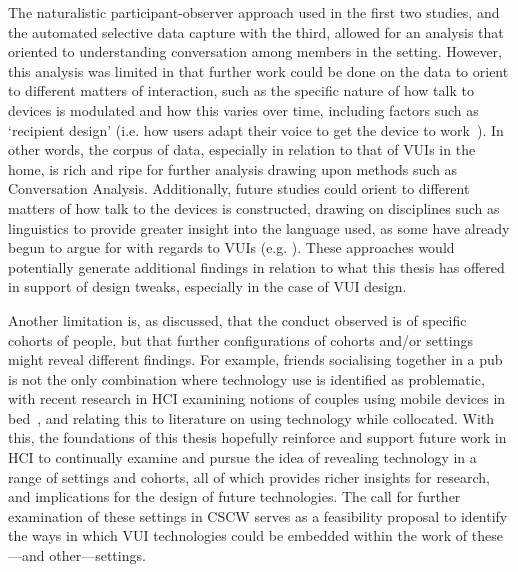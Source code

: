 \begin{revisedsubmission}
The naturalistic participant-observer approach used in the first two studies, and the automated selective data capture with the third, allowed for an analysis that oriented to understanding conversation among members in the setting.
However, this analysis was limited in that further work could be done on the data to orient to different matters of interaction, such as the specific nature of how talk to devices is modulated and how this varies over time, including factors such as `recipient design' (i.e. how users adapt their voice to get the device to work~\citep{Clark1996}).
In other words, the corpus of data, especially in relation to that of \acp{VUI} in the home, is rich and ripe for further analysis drawing upon methods such as Conversation Analysis.
Additionally, future studies could orient to different matters of how talk to the devices is constructed, drawing on disciplines such as linguistics to provide greater insight into the language used, as some have already begun to argue for with regards to \acp{VUI} (e.g. \citet{Sutton2019}).
These approaches would potentially generate additional findings in relation to what this thesis has offered in support of design tweaks, especially in the case of \ac{VUI} design.

Another limitation is, as discussed, that the conduct observed is of specific cohorts of people, but that further configurations of cohorts and/or settings might reveal different findings.
For example, friends socialising together in a pub is not the only combination where technology use is identified as problematic, with recent research in \ac{HCI} examining notions of couples using mobile devices in bed~\citep{Salmela2019}, and relating this to literature on using technology while collocated.
With this, the foundations of this thesis hopefully reinforce and support future work in \ac{HCI} to continually examine and pursue the idea of revealing technology in a range of settings and cohorts, all of which provides richer insights for research, and implications for the design of future technologies.
The call for further examination of these settings in \ac{CSCW} serves as a feasibility proposal to identify the ways in which \ac{VUI} technologies could be embedded within the work of these---and other---settings.


\end{revisedsubmission}
